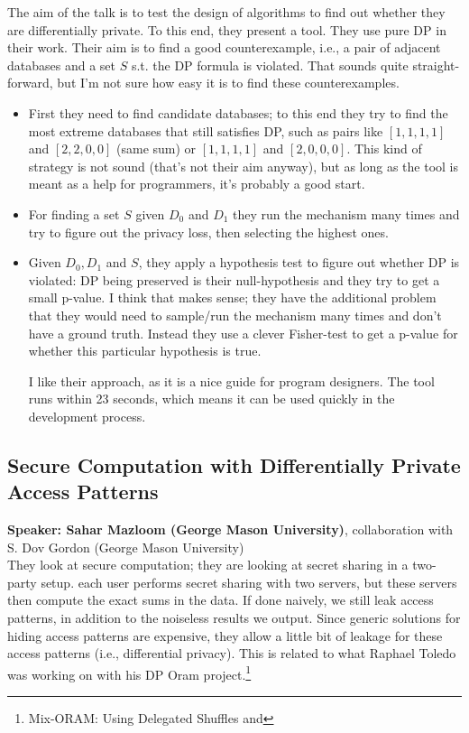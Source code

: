 \documentclass{article}
\begin{document}
The aim of the talk is to test the design of algorithms to find out whether they are differentially private. To this end, they present a tool. They use pure DP in their work. Their aim is to find a good counterexample, i.e., a pair of adjacent databases and a set $S$ s.t. the DP formula is violated. That sounds quite straight-forward, but I'm not sure how easy it is to find these counterexamples.

\begin{itemize}
	\item First they need to find candidate databases; to this end they try to find the most extreme databases that still satisfies DP, such as pairs like $[1,1,1,1]$ and $[2,2,0,0]$ (same sum) or $[1,1,1,1]$ and $[2,0,0,0]$. This kind of strategy is not sound (that's not their aim anyway), but as long as the tool is meant as a help for programmers, it's probably a good start.
	\item For finding a set $S$ given $D_0$ and $D_1$ they run the mechanism many times and try to figure out the privacy loss, then selecting the highest ones.
	\item Given $D_0, D_1$ and $S$, they apply a hypothesis test to figure out whether DP is violated: DP being preserved is their null-hypothesis and they try to get a small p-value. I think that makes sense; they have the additional problem that they would need to sample/run the mechanism many times and don't have a ground truth. Instead they use a clever Fisher-test to get a p-value for whether this particular hypothesis is true.

I like their approach, as it is a nice guide for program designers. The tool runs within 23 seconds, which means it can be used quickly in the development process.

\end{itemize}


\subsection{Secure Computation with Differentially Private Access Patterns}
\noindent\textbf{Speaker: Sahar Mazloom (George Mason University)}, collaboration with S. Dov Gordon (George Mason University)\\

They look at secure computation; they are looking at secret sharing in a two-party setup. each user performs secret sharing with two servers, but these servers then compute the exact sums in the data. If done naively, we still leak access patterns, in addition to the noiseless results we output. Since generic solutions for hiding access patterns are expensive, they allow a little bit of leakage for these access patterns (i.e., differential privacy). This is related to what Raphael Toledo was working on with his DP Oram project.\footnote{Mix-ORAM: Using Delegated Shuffles and }
\end{document}
